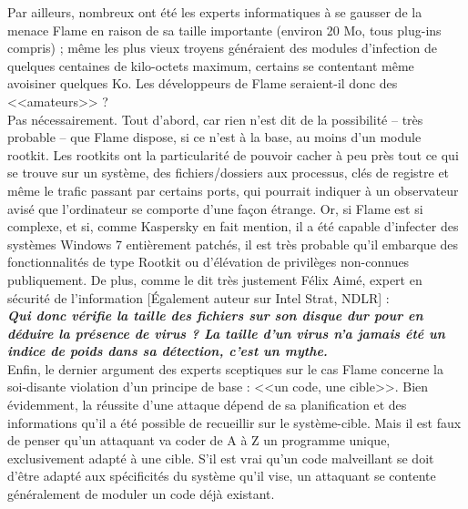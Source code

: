 \documentclass[11pt,twoside,a4paper]{article}
\begin{document}
Par ailleurs, nombreux ont {\'e}t{\'e} les experts informatiques {\`a} se gausser de la menace Flame en raison de sa taille importante (environ 20 Mo, tous plug-ins compris) ; m{\^e}me les plus vieux troyens g{\'e}n{\'e}raient des modules d'infection de quelques centaines de kilo-octets maximum, certains se contentant m{\^e}me avoisiner quelques Ko. Les d{\'e}veloppeurs de Flame seraient-il donc des <<amateurs>> ?~\\

Pas n{\'e}cessairement. Tout d'abord, car rien n'est dit de la possibilit{\'e} -- tr{\`e}s probable -- que Flame dispose, si ce n'est {\`a} la base, au moins d'un module rootkit. Les rootkits ont la particularit{\'e} de pouvoir cacher {\`a} peu pr{\`e}s tout ce qui se trouve sur un syst{\`e}me, des fichiers/dossiers aux processus, cl{\'e}s de registre et m{\^e}me le trafic passant par certains ports, qui pourrait indiquer {\`a} un observateur avis{\'e} que l'ordinateur se comporte d'une fa\c{c}on {\'e}trange. Or, si Flame est si complexe, et si, comme Kaspersky en fait mention, il a {\'e}t{\'e} capable d'infecter des syst{\`e}mes Windows 7 enti{\`e}rement patch{\'e}s, il est tr{\`e}s probable qu'il embarque des fonctionnalit{\'e}s de type Rootkit ou d'{\'e}l{\'e}vation de privil{\`e}ges non-connues publiquement. De plus, comme le dit tr{\`e}s justement F{\'e}lix Aim{\'e}, expert en s{\'e}curit{\'e} de l'information [{\'E}galement auteur sur Intel Strat, NDLR] :~\\

	\textbf{\emph{Qui donc v{\'e}rifie la taille des fichiers sur son disque dur pour en d{\'e}duire la pr{\'e}sence de virus ? La taille d'un virus n'a jamais {\'e}t{\'e} un indice de poids dans sa d{\'e}tection, c'est un mythe.}}~\\

Enfin, le dernier argument des experts sceptiques sur le cas Flame concerne la soi-disante violation d'un principe de base : <<un code, une cible>>. Bien {\'e}videmment, la r{\'e}ussite d'une attaque d{\'e}pend de sa planification et des informations qu'il a {\'e}t{\'e} possible de recueillir sur le syst{\`e}me-cible. Mais il est faux de penser qu'un attaquant va coder de A {\`a} Z un programme unique, exclusivement adapt{\'e} {\`a} une cible. S'il est vrai qu'un code malveillant se doit d'{\^e}tre adapt{\'e} aux sp{\'e}cificit{\'e}s du syst{\`e}me qu'il vise, un attaquant se contente g{\'e}n{\'e}ralement de moduler un code d{\'e}j{\`a} existant.~\\
\end{document}
